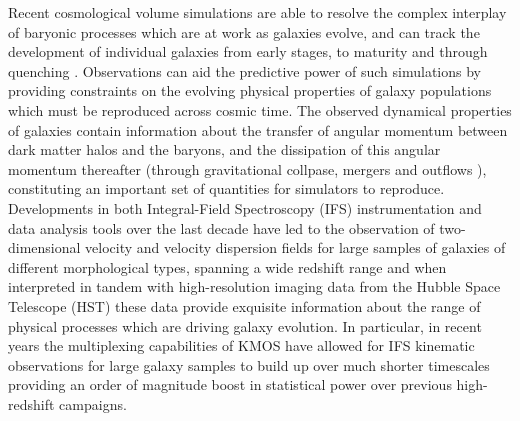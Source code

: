 \documentclass[a4paper,fleqn,usenatbib]{mn2e}
\begin{document}
Recent cosmological volume simulations are able to resolve the complex interplay of baryonic processes which are at work as galaxies evolve, and can track the development of individual galaxies from early stages, to maturity and through quenching \citep{Dubois2014a,Vogelsberger2014b,Schaye2015}.
Observations can aid the predictive power of such simulations by providing constraints on the evolving physical properties of galaxy populations which must be reproduced across cosmic time.
The observed dynamical properties of galaxies contain information about the transfer of angular momentum between dark matter halos and the baryons, and the dissipation of this angular momentum thereafter (through gravitational collpase, mergers and outflows \cite[e.g.][]{Fall1983,Romanowsky2012,Fall2013}), constituting an important set of quantities for simulators to reproduce.
Developments in both Integral-Field Spectroscopy (IFS) instrumentation and data analysis tools over the last decade have led to the observation of two-dimensional velocity and velocity dispersion fields for large samples of galaxies of different morphological types, spanning a wide redshift range \citep[e.g.][]{Sarzi2005,Flores2006,Epinat2008,ForsterSchreiber2009,Cappellari2011,Gnerucci2011,Epinat2012,Croom2012,Bundy2015,Wisnioski2015,Stott2016} and when interpreted in tandem with high-resolution imaging data from the Hubble Space Telescope (HST) these data provide exquisite information about the range of physical processes which are driving galaxy evolution.
In particular, in recent years the multiplexing capabilities of KMOS have allowed for IFS kinematic observations for large galaxy samples to build up over much shorter timescales \citep{Sobral2013,Wisnioski2015,Stott2016,Harrison2016,Mason2016} providing an order of magnitude boost in statistical power over previous high-redshift campaigns.    
\end{document}
